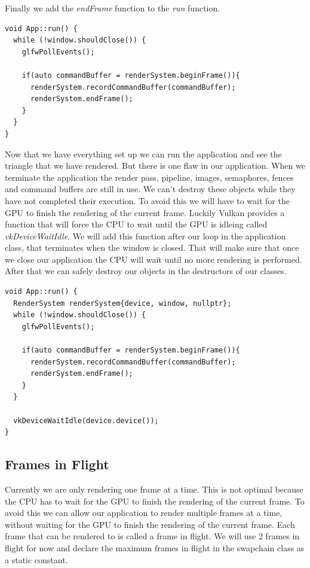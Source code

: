 \documentclass[12pt]{report} \usepackage{preamble}
\begin{document}
Finally we add the \textit{endFrame} function to the \textit{run} function.

\begin{lstlisting}[Language=C++]
void App::run() {
  while (!window.shouldClose()) {
    glfwPollEvents();

    if(auto commandBuffer = renderSystem.beginFrame()){
      renderSystem.recordCommandBuffer(commandBuffer); 
      renderSystem.endFrame();
    }
  }
}
\end{lstlisting}

Now that we have everything set up we can run the application and see the triangle that we have rendered.
But there is one flaw in our application. When we terminate the application the render pass, pipeline, images, semaphores, fences and command buffers
are still in use. We can't destroy these objects while they have not completed their execution. To avoid this we will have to wait for the
GPU to finish the rendering of the current frame. Luckily Vulkan provides a function that will force the \ac{CPU} to wait until the \ac{GPU}
is idleing called \textit{vkDeviceWaitIdle}. We will add this function after our loop in the application class, that terminates when the window
is closed. That will make sure that once we close our application the \ac{CPU} will wait until no more rendering is performed. After that we can
safely destroy our objects in the destructors of our classes.

\begin{lstlisting}[Language=C++]
void App::run() {
  RenderSystem renderSystem{device, window, nullptr};
  while (!window.shouldClose()) {
    glfwPollEvents();

    if(auto commandBuffer = renderSystem.beginFrame()){
      renderSystem.recordCommandBuffer(commandBuffer); 
      renderSystem.endFrame();
    }
  }

  vkDeviceWaitIdle(device.device());
}
\end{lstlisting}

\subsection{Frames in Flight}

Currently we are only rendering one frame at a time. This is not optimal because the CPU has to wait for the GPU to finish the rendering
of the current frame. To avoid this we can allow our application to render multiple frames at a time, without waiting for the GPU to finish
the rendering of the current frame. Each frame that can be rendered to is called a frame in flight. We will use 2 frames in flight for now
and declare the maximum frames in flight in the swapchain class as a static constant.
\end{document}
